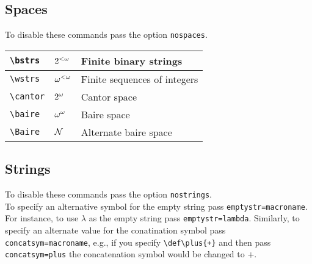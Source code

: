 \documentclass[leqno,11pt]{amsart}
\begin{document}
\subsection{Spaces}
To disable these commands pass the option \verb=nospaces=.\\  

\begin{tabular}{l |  l | l}\toprule
	\verb=\bstrs=		       & \( 2^{<\omega}  \) & Finite binary strings        \\	\midrule
	\verb=\wstrs=                 & \( \omega^{<\omega}  \) & Finite sequences of integers \\ 	\midrule
	\verb=\cantor=                & \( 2^{\omega} \) & Cantor space		     \\    \midrule
	\verb=\baire=                 & \( \omega^{\omega}  \) & Baire space                  \\[6pt]
	\verb=\Baire=                 & \( \mathcal{N}  \) & Alternate baire space        \\
		\bottomrule
	\end{tabular}

\subsection{Strings}
To disable these commands pass the option \verb=nostrings=.\\

To specify an alternative symbol for the empty string pass \verb!emptystr=macroname!.  For instance, to use \( \lambda \) as the empty string pass \verb!emptystr=lambda!.  Similarly, to specify an alternate value for the conatination symbol pass \verb!concatsym=macroname!, e.g., if you specify \verb!\def\plus{+}! and then pass \verb!concatsym=plus! the concatenation symbol would be changed to \( + \).
\end{document}
